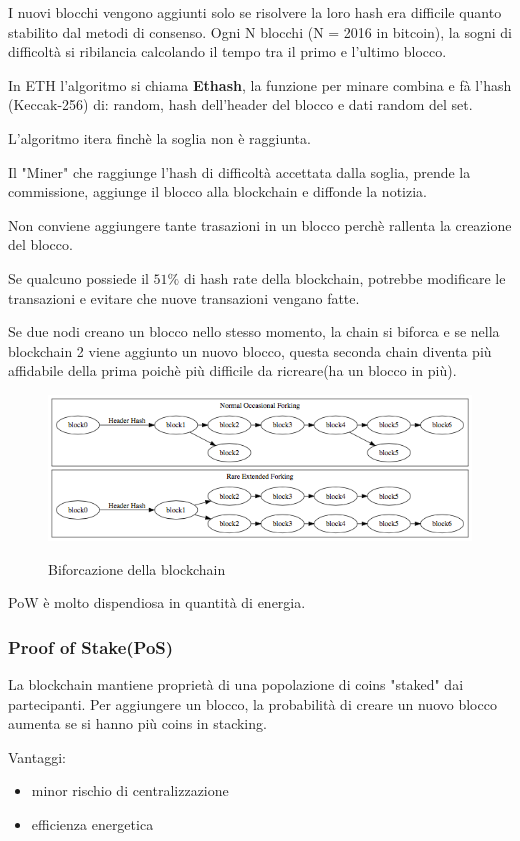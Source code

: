 I nuovi blocchi vengono aggiunti solo se risolvere la loro hash era difficile quanto stabilito dal metodi di consenso.
Ogni N blocchi (N = 2016 in bitcoin), la sogni di difficoltà si ribilancia calcolando il tempo tra il primo e l'ultimo blocco.

In ETH l'algoritmo si chiama \textbf{Ethash}, la funzione per minare combina e fà l'hash (Keccak-256) di: random, hash dell'header del blocco e dati random del set.

L'algoritmo itera finchè la soglia non è raggiunta.

Il "Miner" che raggiunge l'hash di difficoltà accettata dalla soglia, prende la commissione, aggiunge il blocco alla blockchain e diffonde la notizia.

Non conviene aggiungere tante trasazioni in un blocco perchè rallenta la creazione del blocco.


Se qualcuno possiede il $51\%$ di hash rate della blockchain, potrebbe modificare le transazioni e evitare che nuove transazioni vengano fatte.

Se due nodi creano un blocco nello stesso momento, la chain si biforca e se nella blockchain 2 viene aggiunto un nuovo blocco, questa seconda chain diventa più affidabile della prima poichè più difficile da ricreare(ha un blocco in più).

\begin{figure}[!ht]
    \centering
    \includegraphics[width=0.5\linewidth]{imgs/18 - fork.png}
    \label{fig:fork}
    \caption{Biforcazione della blockchain}
\end{figure}

PoW è molto dispendiosa in quantità di energia.


\subsubsection{Proof of Stake(PoS)}

La blockchain mantiene proprietà di una popolazione di coins "staked" dai partecipanti.
Per aggiungere un blocco, la probabilità di creare un nuovo blocco aumenta se si hanno più coins in stacking.

Vantaggi:
\begin{itemize}
    \item minor rischio di centralizzazione
    \item efficienza energetica
\end{itemize}

